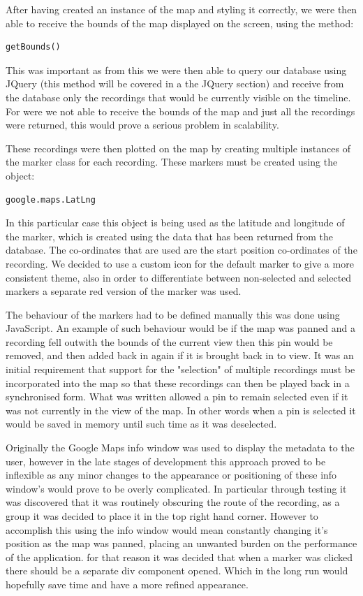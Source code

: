 \documentclass{l3proj}
\begin{document}
After having created an instance of the map and styling it correctly, we were then able to receive the bounds of the map displayed on the screen, using the method:
\begin{verbatim}
getBounds()
\end{verbatim}
This was important as from this we were then able to query our database using \gls{JQuery} (this method will be covered in a the JQuery section) and receive from the database only the recordings that would be currently visible on the timeline. For were we not able to receive the bounds of the map and just all the recordings were returned, this would prove a serious problem in scalability.

These recordings were then plotted on the map by creating multiple instances of the marker class for each recording. These markers must be created using the object:
\begin{verbatim}
google.maps.LatLng
\end{verbatim}
In this particular case this object is being used as the latitude and longitude of the marker, which is created using the data that has been returned from the database. The co-ordinates that are used are the start position co-ordinates of the recording. We decided to use a custom icon for the default marker to give a more consistent theme, also in order to differentiate between non-selected and selected markers a separate red version of the marker was used.

The behaviour of the markers had to be defined manually this was done using \gls{JavaScript}. An example of such behaviour would be if the map was panned and a recording fell outwith the bounds of the current view then this pin would be removed, and then added back in again if it is brought back in to view. It was an initial requirement that support for the "selection" of multiple recordings must be incorporated into the map so that these recordings can then be played back in a synchronised form. What was written allowed a pin to remain selected even if it was not currently in the view of the map. In other words when a pin is selected it would be saved in memory until such time as it was deselected.

Originally the Google Maps info window was used to display the metadata to the user, however in the late stages of development this approach proved to be inflexible as any minor changes to the appearance or positioning of these info window’s would prove to be overly complicated. In particular through testing it was discovered that it was routinely obscuring the route of the recording, as a group it was decided to place it in the top right hand corner. However to accomplish this using the info window would mean constantly changing it's position as the map was panned, placing an unwanted burden on the performance of the application. for that reason it was decided that when a marker was clicked there should be a separate div component opened. Which in the long run would hopefully save time and have a more refined appearance.
\end{document}
